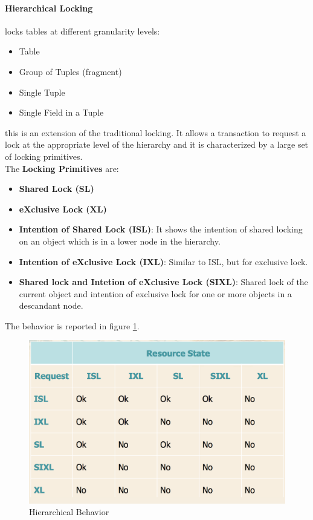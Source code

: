 \documentclass[12pt]{article}
\begin{document}
\paragraph{Hierarchical Locking} locks tables at different granularity levels:
\begin{itemize}
  \item Table
  \item Group of Tuples (fragment)
  \item Single Tuple
  \item Single Field in a Tuple
\end{itemize}
this is an extension of the traditional locking. It allows a transaction to request a lock at the appropriate level of the hierarchy and it is characterized by a large set of locking primitives.\\
The \textbf{Locking Primitives} are:
\begin{itemize}
  \item \textbf{Shared Lock (SL)}
  \item \textbf{eXclusive Lock (XL)}
  \item \textbf{Intention of Shared Lock (ISL)}: It shows the intention of shared locking on an object which is in a lower node in the hierarchy.
  \item \textbf{Intention of eXclusive Lock (IXL)}: Similar to ISL, but for exclusive lock.
  \item \textbf{Shared lock and Intetion of eXclusive Lock (SIXL)}: Shared lock of the current object and intention of exclusive lock for one or more objects in a descandant node.
\end{itemize}
The behavior is reported in figure \ref{fig:hierlock}.
\begin{figure}[h!]
  \includegraphics[width=\linewidth]{images/hierlock.png}
  \caption{Hierarchical Behavior}
  \label{fig:hierlock}
\end{figure}
\end{document}
